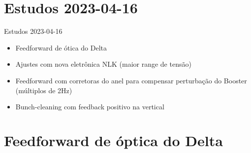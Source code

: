 \documentclass[1611]{beamer}					  %
\begin{document}
\section{Estudos 2023-04-16}

\begin{frame}{Estudos 2023-04-16}
    \begin{itemize}
        \item Feedforward de ótica do Delta
        \item Ajustes com nova eletrônica NLK (maior range de tensão)
        \item Feedforward com corretoras do anel para compensar perturbação do Booster (múltiplos de 2Hz)
        \item Bunch-cleaning com feedback positivo na vertical
    \end{itemize}
\end{frame}


\section{Feedforward de óptica do Delta}
\end{document}
